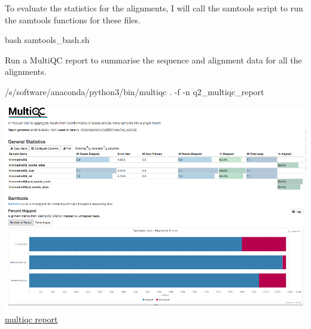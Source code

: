 \documentclass[]{article}
\newenvironment{Shaded}{\begin{snugshade}}{\end{snugshade}}
\newcommand{\FunctionTok}[1]{\textcolor[rgb]{0.00,0.00,0.00}{#1}}
\newcommand{\VariableTok}[1]{\textcolor[rgb]{0.00,0.00,0.00}{#1}}
\newcommand{\OperatorTok}[1]{\textcolor[rgb]{0.81,0.36,0.00}{\textbf{#1}}}
\newcommand{\BuiltInTok}[1]{#1}
\newcommand{\ExtensionTok}[1]{#1}
\newcommand{\NormalTok}[1]{#1}
\begin{document}
\begin{Shaded}
\end{Shaded}

To evaluate the statistics for the alignments, I will call the samtools
script to run the samtools functions for these files.

\begin{Shaded}
\begin{Highlighting}[]
\FunctionTok{bash}\NormalTok{ samtools_bash.sh}
\end{Highlighting}
\end{Shaded}

Run a MultiQC report to summarise the sequence and alignment data for
all the alignments.

\begin{Shaded}
\begin{Highlighting}[]
\ExtensionTok{/s/software/anaconda/python3/bin/multiqc}\NormalTok{ . -f -n q2_multiqc_report}
\end{Highlighting}
\end{Shaded}

\includegraphics{Multiqc_report_q2.png}\\
\href{/d/projects/u/sj003/results_cw1/q2_multiqc_report.html}{multiqc
report}
\end{document}
